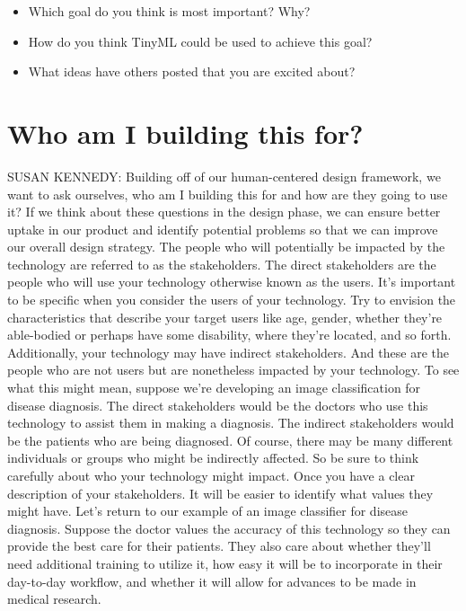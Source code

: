 \begin{itemize}
  \item Which goal do you think is most important? Why?
  \item How do you think TinyML could be used to achieve this goal?
  \item What ideas have others posted that you are excited about?
\end{itemize}


\section{Who am I building this for?}

SUSAN KENNEDY: Building off of our human-centered design framework,
we want to ask ourselves, who am I building this for
and how are they going to use it?
If we think about these questions in the design phase,
we can ensure better uptake in our product
and identify potential problems so that we can improve our overall design
strategy.
The people who will potentially be impacted by the technology
are referred to as the stakeholders.
The direct stakeholders are the people who
will use your technology otherwise known as the users.
It's important to be specific when you consider the users of your technology.
Try to envision the characteristics that describe your target users like age,
gender, whether they're able-bodied or perhaps
have some disability, where they're located, and so forth.
Additionally, your technology may have indirect stakeholders.
And these are the people who are not users but are nonetheless
impacted by your technology.
To see what this might mean, suppose we're developing an image
classification for disease diagnosis.
The direct stakeholders would be the doctors
who use this technology to assist them in making a diagnosis.
The indirect stakeholders would be the patients who are being diagnosed.
Of course, there may be many different individuals or groups
who might be indirectly affected.
So be sure to think carefully about who your technology might impact.
Once you have a clear description of your stakeholders.
It will be easier to identify what values they might have.
Let's return to our example of an image classifier for disease diagnosis.
Suppose the doctor values the accuracy of this technology
so they can provide the best care for their patients.
They also care about whether they'll need additional training to utilize it,
how easy it will be to incorporate in their day-to-day workflow,
and whether it will allow for advances to be made in medical research.
